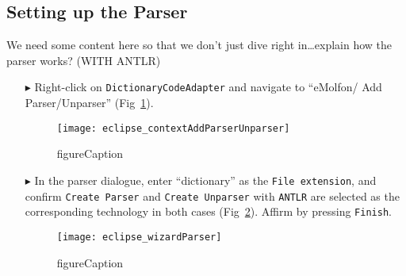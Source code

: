 \newpage
\hypertarget{subSec:setupParser}{}
\subsection{Setting up the Parser}
\genHeader

We need some content here so that we don't just dive right in\ldots explain how the parser works? (WITH ANTLR)

\begin{itemize}

% 

\item[$\blacktriangleright$] Right-click on \texttt{DictionaryCodeAdapter} and navigate to ``eMolfon/ Add Parser/Unparser'' (Fig~\ref{eclipse:contextParser}).

\begin{figure}[htpb]
\begin{center}
  \texttt{[image: eclipse\_contextAddParserUnparser]}
  \caption{figureCaption}
  \label{eclipse:contextParser}
\end{center}
\end{figure}

\item[$\blacktriangleright$] In the parser dialogue, enter ``dictionary'' as the \texttt{File extension}, and confirm \texttt{Create Parser} and \texttt{Create
Unparser} with \texttt{ANTLR} are selected as the corresponding technology in both cases (Fig~\ref{eclipse:wizardParser}). Affirm by pressing \texttt{Finish}.

\begin{figure}[htpb]
\begin{center}
  \texttt{[image: eclipse\_wizardParser]}
  \caption{figureCaption}
  \label{eclipse:wizardParser}
\end{center}
\end{figure}


\end{itemize}
